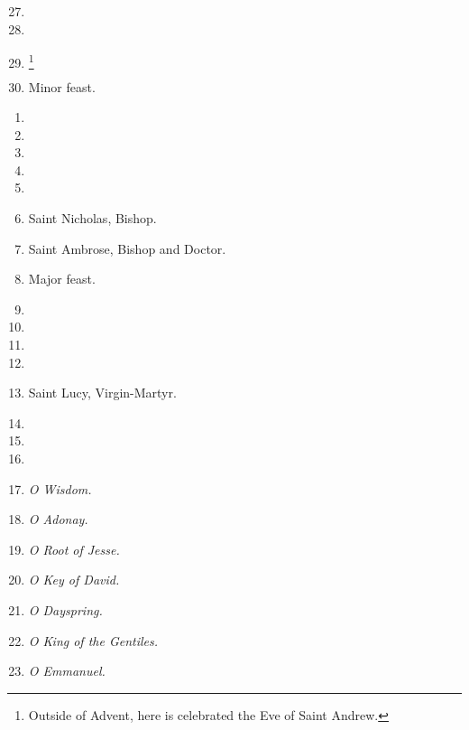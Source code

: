 		\begin{enumerate}
			\setcounter{enumi}{26}
			\item 
			\item %
			\item \footnote{Outside of Advent, here is celebrated the Eve of Saint Andrew.}
			\item {} Minor feast.
		\end{enumerate}
		\begin{enumerate}
			\item %
			\item %
			\item  %
			\item  %
			\item %
			\item Saint Nicholas, Bishop. 
			\item Saint Ambrose, Bishop and Doctor. 
			\item {} Major feast.
			\item %
			\item %
			\item %
			\item  %
			\item Saint Lucy, Virgin-Martyr. 
			\item  %
			\item %
			\item %
			\item {\textit{\small O Wisdom.}} %
			\item  {\textit{\small O Adonay.}} %
			\item  {\textit{\small O Root of Jesse.}} %
			\item  {\textit{\small O Key of David.}} %
			\item {\textit{\small O Dayspring.}} %
			\item {\textit{\small O King of the Gentiles.}} %
			\item {\textit{\small O Emmanuel.}} %
		\end{enumerate}